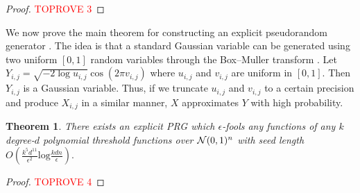 \documentclass[12pt]{article}
\newtheorem{theorem}{Theorem}[section]
\newcommand{\br}[1]{\left(#1\right)} \newcommand{\Br}[1]{\left[#1\right]} \newcommand{\st}[1]{\left\{#1\right\}} \newcommand{\tr}[1]{\mathrm{Tr}\!\Br{#1}} \newcommand{\abs}[1]{\left|#1 \right|} \newcommand{\norm}[1]{\left\lVert #1 \right\rVert} \newcommand{\agl}[2]{\theta^{\br{#1}}_{#2}} \newcommand{\aglp}[2]{{\theta'}^{\br{#1}}_{#2}} \newcommand{\lint}[1]{\left\lfloor#1\right\rfloor} \newcommand{\poly}[1]{\mathrm{poly}\!\br{#1}} \newcommand{\negl}[1]{\mathrm{negl}\!\br{#1}} \newcommand{\de}[1]{\mathrm{d}#1} \newcommand{\val}[1]{\mathrm{val}\!\br{#1}} \newcommand{\vall}[1]{\mathrm{val}\br{#1}} \newcommand{\nd}[1]{\mathcal{N}\!\br{#1}} \newcommand{\ketbratwo}[2]{\ket{#1} \hspace{-0.4em}\bra{#2}} \newcommand{\ketbra}[1]{\ketbratwo{#1}{#1}} \newcommand{\id}{\ensuremath{\mathds{1}}} \newcommand{\ogroup}[1]{\mathrm{O}\!\br{#1}} \newcommand{\ugroup}[1]{\mathrm{U}\!\br{#1}} \newcommand{\td}{\mathrm{TD}} \newcommand{\tv}[1]{\norm{#1}_{\mathrm{TV}}} \newcommand {\defeq} {\ensuremath{ \stackrel{\mathrm{def}}{=} }} \newcommand{\vdim}{\ensuremath{N}} \newcommand{\dimin}{\ensuremath{n}} \newcommand{\dimout}{\ensuremath{m}} \newcommand{\ncopy}{\ell} \newcommand{\hspacein}{\H_\mathrm{in}} \newcommand{\hspaceout}{\H_\mathrm{out}} \newcommand{\Sin}{\S(\hspacein)} \newcommand{\Sout}{\S(\hspaceout)} \newcommand{\haar}{\ensuremath{\mu}} \newcommand{\tensorhaar}{\ensuremath{\eta}} \newcommand{\tensorsrss}{\ensuremath{\nu}} \newcommand{\qadvice}{\ensuremath{\rho}} \newcommand{\tp}{\otimes} \newcommand{\wone}[2]{W_1\!\br{#1,#2}}
\begin{document}
\begin{proof}\textcolor{red}{TOPROVE 3}\end{proof}




We now prove the main theorem for constructing an explicit pseudorandom generator .
The idea is that a standard Gaussian variable can be generated using two uniform $[0,1]$ random variables
through the Box–Muller transform \cite{Bm58}.
Let
$
	Y_{i,j} = \sqrt{-2 \log u_{i,j}}\cos(2\pi v_{i,j})
$ 
where $u_{i,j}$ and $v_{i,j}$ are uniform in $[0,1]$. Then $Y_{i,j}$ is a Gaussian variable.
Thus, if we truncate $u_{i,j}$ and $v_{i,j}$ to a certain precision and produce $X_{i,j}$ in a similar manner, $X$ approximates $Y$ with high probability.

\begin{theorem}\label{thm:main_formal}
	There exists an explicit PRG which $\epsilon$-fools any functions of any $k$ degree-$d$ polynomial threshold functions over $\mathcal{N}(0,1)^n$ with seed length
	$
		O\br{\frac{k^5d^{11}}{\epsilon^{2}} \mathrm{log}\frac{kdn}{\epsilon} } .	
	$
\end{theorem}

\begin{proof}\textcolor{red}{TOPROVE 4}\end{proof}








 
\newpage


\end{document}
